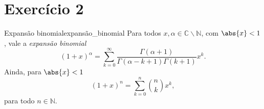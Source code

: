 \section*{Exercício 2}

\begin{proposition}{Expansão binomial}{expansão_binomial}
    Para todos \(x,\alpha \in \mathbb{C} \smallsetminus \mathbb{N}\), com \(\abs{x} < 1\), vale a \emph{expansão binomial}
    \begin{equation*}
        (1 + x)^\alpha = \sum_{k = 0}^\infty \frac{\Gamma(\alpha + 1)}{\Gamma(\alpha - k + 1)\Gamma(k+1)}x^k.
    \end{equation*}
    Ainda, para \(\abs{x} < 1\)
    \begin{equation*}
        (1 + x)^n = \sum_{k = 0}^{n} \binom{n}{k}x^k,
    \end{equation*}
    para todo \(n \in \mathbb{N}\).
\end{proposition}
